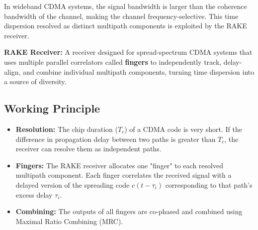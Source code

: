 \documentclass[12pt,a4paper]{article}
\begin{document}
In wideband CDMA systems, the signal bandwidth is larger than the coherence bandwidth of the channel, making the channel frequency-selective. This time dispersion resolved as distinct multipath components is exploited by the RAKE receiver.

\begin{tcolorbox}[defbox]
\textbf{RAKE Receiver:} A receiver designed for spread-spectrum CDMA systems that uses multiple parallel correlators called \textbf{fingers} to independently track, delay-align, and combine individual multipath components, turning time dispersion into a source of diversity.
\end{tcolorbox}

\subsection{Working Principle}
\begin{itemize}[leftmargin=*, itemsep=3.0pt]
  \item \textbf{Resolution:} The chip duration ($T_c$) of a CDMA code is very short. If the difference in propagation delay between two paths is greater than $T_c$, the receiver can resolve them as independent paths.
  \item \textbf{Fingers:} The RAKE receiver allocates one "finger" to each resolved multipath component. Each finger correlates the received signal with a delayed version of the spreading code $c(t - \tau_i)$ corresponding to that path's excess delay $\tau_i$.
  \item \textbf{Combining:} The outputs of all fingers are co-phased and combined using Maximal Ratio Combining (MRC).
\end{itemize}
\end{document}
